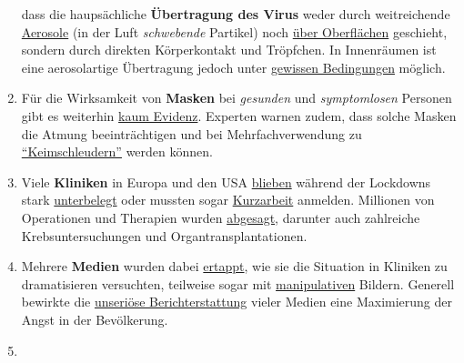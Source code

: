 \begin{enumerate}
  dass die haupsächliche \textbf{Übertragung des Virus} weder durch
  weitreichende
  \href{https://www.who.int/news-room/commentaries/detail/transmission-of-sars-cov-2-implications-for-infection-prevention-precautions}{Aerosole}
  (in der Luft \emph{schwebende} Partikel) noch
  \href{https://www.yahoo.com/lifestyle/cdc-coronavirus-mainly-spreads-through-persontoperson-contact-and-does-not-spread-easily-on-contaminated-surfaces-153317029.html}{über
  Oberflächen} geschieht, sondern durch direkten Körperkontakt und
  Tröpfchen. In Innenräumen ist eine aerosolartige Übertragung jedoch
  unter
  \href{https://jamanetwork.com/journals/jama/fullarticle/2768396}{gewissen
  Bedingungen} möglich.
\item
  Für die Wirksamkeit von \textbf{Masken} bei \emph{gesunden} und
  \emph{symptomlosen} Personen gibt es weiterhin
  \href{https://swprs.org/face-masks-evidence/}{kaum Evidenz}. Experten
  warnen zudem, dass solche Masken die Atmung beeinträchtigen und bei
  Mehr­fach­verwendung zu
  \href{https://de.sputniknews.com/interviews/20200425326953541-corona-gefahr-virologe/}{``Keimschleudern''}
  werden können.
\item
  Viele \textbf{Kliniken} in Europa und den USA
  \href{https://www.usatoday.com/story/news/health/2020/04/02/coronavirus-pandemic-jobs-us-health-care-workers-furloughed-laid-off/5102320002/}{blieben}
  während der Lockdowns stark
  \href{https://www.spiegel.de/wirtschaft/unternehmen/trotz-corona-pandemie-warum-kliniken-jetzt-kurzarbeit-anmelden-a-3dc61bc9-fb12-4298-8022-bb4c2be39d7d}{unterbelegt}
  oder mussten sogar
  \href{https://www.20min.ch/schweiz/news/story/Spitaeler-28949526}{Kurzarbeit}
  anmelden. Millionen von Operationen und Therapien wurden
  \href{https://www.birmingham.ac.uk/news/latest/2020/05/covid-disruption-28-million-surgeries-cancelled.aspx}{abgesagt},
  darunter auch zahlreiche Krebs­unter­suchungen und
  Organ­trans­plan­ta­tionen.
\item
  Mehrere \textbf{Medien} wurden dabei
  \href{https://nypost.com/2020/04/01/cbs-admits-to-using-footage-from-italy-in-report-about-nyc/}{ertappt},
  wie sie die Situation in Kliniken zu dramatisieren versuchten,
  teilweise sogar mit
  \href{https://www.wsj.com/articles/cbs-says-fake-news-wasnt-theirs-11588789238}{manipulativen}
  Bildern. Generell bewirkte die
  \href{https://www.infosperber.ch/Artikel/Medien/Corona-Medien-verbreiten-weiter-unbeirrt-statistischen-Unsinn}{unseriöse
  Berichterstattung} vieler Medien eine Maximierung der Angst in der
  Bevölkerung.
\item

\end{enumerate}
